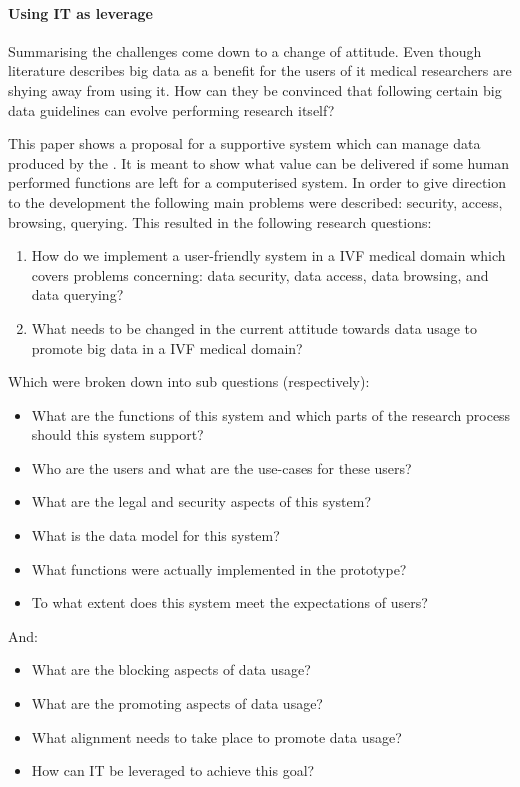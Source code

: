 \paragraph{Using IT as leverage}
Summarising the challenges come down to a change of attitude.
Even though literature describes big data as a benefit for the users of it medical researchers are shying away from using it.
How can they be convinced that following certain big data guidelines can evolve performing research itself?

This paper shows a proposal for a supportive system which can manage data produced by the \project{}.
It is meant to show what value can be delivered if some human performed functions are left for a computerised system.
In order to give direction to the development the following main problems were described: security, access, browsing, querying.
This resulted in the following research questions:

\begin{enumerate}
	\item How do we implement a user-friendly system in a IVF medical domain which covers problems concerning: data security, data access, data browsing, and data querying?
	\item What needs to be changed in the current attitude towards data usage to promote big data in a IVF medical domain?
\end{enumerate}

Which were broken down into sub questions (respectively):

\begin{itemize}
	\item What are the functions of this system and which parts of the research process should this system support?
	\item Who are the users and what are the use-cases for these users?
	\item What are the legal and security aspects of this system?
	\item What is the data model for this system?
	\item What functions were actually implemented in the prototype?
	\item To what extent does this system meet the expectations of users?
\end{itemize}

And:

\begin{itemize}
	\item What are the blocking aspects of data usage?
	\item What are the promoting aspects of data usage?
	\item What alignment needs to take place to promote data usage?
	\item How can IT be leveraged to achieve this goal?
\end{itemize}